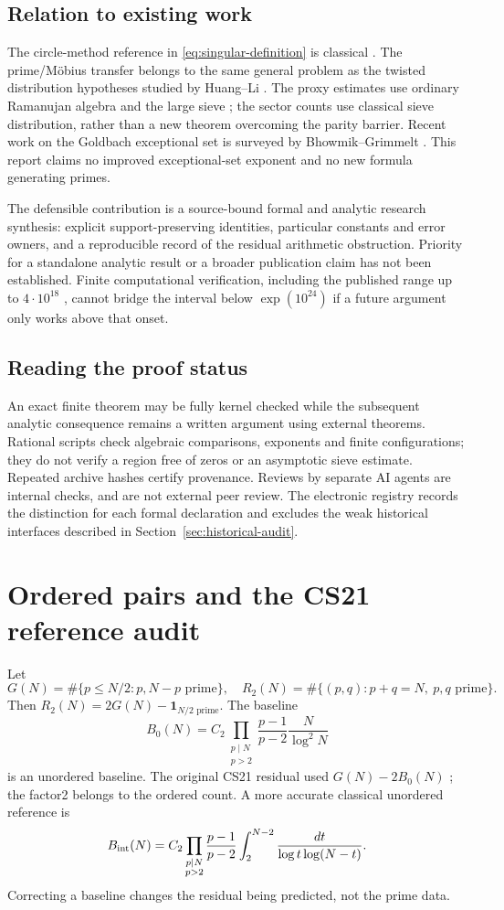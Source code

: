 \documentclass[11pt,a4paper]{article}
\theoremstyle{definition}
\theoremstyle{remark}
\newcommand{\ind}{\mathbf1}
\begin{document}
\subsection{Relation to existing work}
The circle-method reference in \eqref{eq:singular-definition} is classical \cite{HL}. The prime/M\"obius transfer belongs to the same general problem as the twisted distribution hypotheses studied by Huang--Li \cite{HLi}. The proxy estimates use ordinary Ramanujan algebra and the large sieve \cite{MV,GY}; the sector counts use classical sieve distribution, rather than a new theorem overcoming the parity barrier. Recent work on the Goldbach exceptional set is surveyed by Bhowmik--Grimmelt \cite{BG}. This report claims no improved exceptional-set exponent and no new formula generating primes.

The defensible contribution is a source-bound formal and analytic research synthesis: explicit support-preserving identities, particular constants and error owners, and a reproducible record of the residual arithmetic obstruction. Priority for a standalone analytic result or a broader publication claim has not been established. Finite computational verification, including the published range up to $4\cdot10^{18}$ \cite{OeS}, cannot bridge the interval below $\exp(10^{24})$ if a future argument only works above that onset.

\subsection{Reading the proof status}
An exact finite theorem may be fully kernel checked while the subsequent analytic consequence remains a written argument using external theorems. Rational scripts check algebraic comparisons, exponents and finite configurations; they do not verify a region free of zeros or an asymptotic sieve estimate. Repeated archive hashes certify provenance. Reviews by separate AI agents are internal checks, and are not external peer review. The electronic registry records the distinction for each formal declaration and excludes the weak historical interfaces described in Section~\ref{sec:historical-audit}.

\section{Ordered pairs and the CS21 reference audit}\label{sec:cs21}
Let
\[G(N)=\#\{p\le N/2:p,N-p\text{ prime}\},\quad
R_2(N)=\#\{(p,q):p+q=N,\ p,q\text{ prime}\}.\]
Then $R_2(N)=2G(N)-\ind_{N/2\text{ prime}}$. The baseline
\[B_0(N)=C_2\prod_{\substack{p\mid N\\p>2}}\frac{p-1}{p-2}\frac{N}{\log^2N}\]
is an unordered baseline. The original CS21 residual used $G(N)-2B_0(N)$ \cite{CS21}; the factor2 belongs to the ordered count. A more accurate classical unordered reference is
\[ B_{\rm int}(N)=C_2\prod_{\substack{p\mid N\\p>2}}\frac{p-1}{p-2}
 \int_2^{N-2}\frac{dt}{\log t\log(N-t)}.\]
Correcting a baseline changes the residual being predicted, not the prime data.
\end{document}
